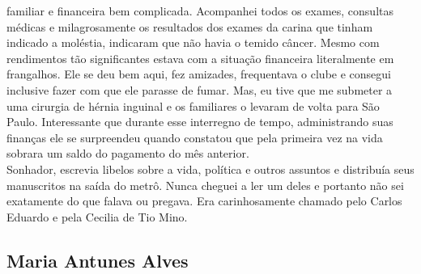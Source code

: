 \documentclass[12pt,brazil,]{book}
\begin{document}
familiar e financeira bem complicada. Acompanhei todos os exames,
consultas médicas e milagrosamente os resultados dos exames da carina
que tinham indicado a moléstia, indicaram que não havia o temido câncer.
Mesmo com rendimentos tão significantes estava com a situação financeira
literalmente em frangalhos. Ele se deu bem aqui, fez amizades,
frequentava o clube e consegui inclusive fazer com que ele parasse de
fumar. Mas, eu tive que me submeter a uma cirurgia de hérnia inguinal e
os familiares o levaram de volta para São Paulo. Interessante que
durante esse interregno de tempo, administrando suas finanças ele se
surpreendeu quando constatou que pela primeira vez na vida sobrara um
saldo do pagamento do mês anterior.\\
Sonhador, escrevia libelos sobre a vida, política e outros assuntos e
distribuía seus manuscritos na saída do metrô. Nunca cheguei a ler um
deles e portanto não sei exatamente do que falava ou pregava. Era
carinhosamente chamado pelo Carlos Eduardo e pela Cecilia de Tio Mino.

\subsection{Maria Antunes Alves}\label{maria-antunes-alves}
\end{document}
